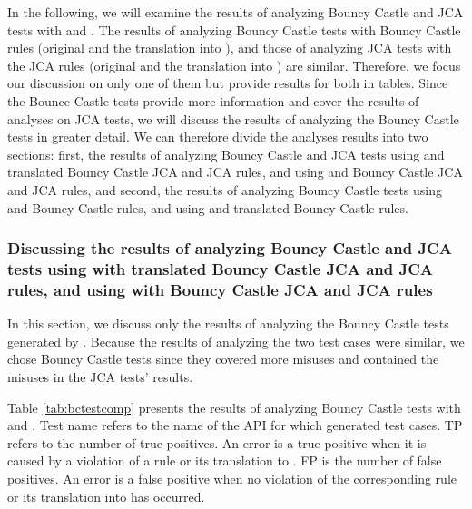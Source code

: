 In the following, we will examine the results of analyzing Bouncy Castle and JCA tests with \codyze{} and \cognicryptsast. The results of analyzing Bouncy Castle tests with Bouncy Castle \crysl{} rules (original and the translation into \MARK), and those of analyzing JCA tests with the JCA \crysl{} rules (original and the translation into \MARK) are similar. Therefore, we focus our discussion on only one of them but provide results for both in tables. Since the Bounce Castle tests provide more information and cover the results of analyses on JCA tests, we will discuss the results of analyzing the Bouncy Castle tests in greater detail. We can therefore divide the analyses results into two sections: first, the results of analyzing Bouncy Castle and JCA tests using \codyze{} and translated Bouncy Castle JCA and JCA \MARK{} rules, and using \cognicryptsast{} and Bouncy Castle JCA and JCA \crysl{} rules, and second, the results of analyzing Bouncy Castle tests using \codyze{} and Bouncy Castle \MARK{} rules, and using \cognicryptsast{} and translated Bouncy Castle \crysl{} rules.


\subsubsection{Discussing the results of analyzing Bouncy Castle and JCA tests using \codyze{} with translated Bouncy Castle JCA and JCA \MARK{} rules, and using \cognicryptsast{} with Bouncy Castle JCA and JCA \crysl{} rules}
\label{sec:testgenbcresult}

In this section, we discuss only the results of analyzing the Bouncy Castle tests generated by \cognicrypttestgen. Because the results of analyzing the two test cases were similar, we chose Bouncy Castle tests since they covered more misuses and contained the misuses in the JCA tests' results. 

Table \ref{tab:bctestcomp} presents the results of analyzing Bouncy Castle tests with \codyze{} and \cognicryptsast. Test name refers to the name of the API for which \cognicrypttestgen{} generated test cases. TP refers to the number of true positives. An error is a true positive when it is caused by a violation of a \crysl{} rule or its translation to \MARK. FP is the number of false positives. An error is a false positive when no violation of the corresponding \crysl{} rule or its translation into \MARK{} has occurred.


